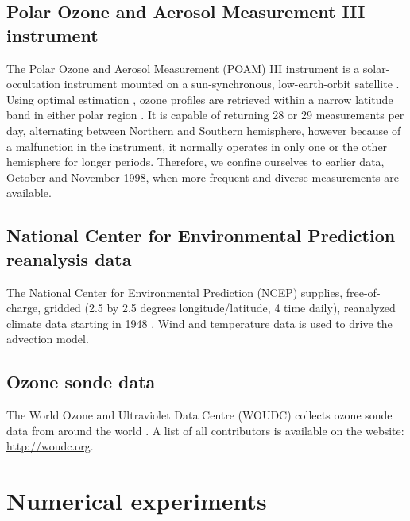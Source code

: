 \documentclass{article}
\begin{document}
\subsection{Polar Ozone and Aerosol Measurement III instrument}

The Polar Ozone and Aerosol Measurement (POAM) III instrument is a solar-
occultation instrument mounted on a sun-synchronous, low-earth-orbit
satellite \citep{Lucke_etal1999}.  
Using optimal estimation \citep{Rodgers2000}, ozone profiles are retrieved 
within a narrow latitude band in either polar region \citep{Lumpe_etal2002}.  
It is capable of returning 28 or 29 measurements per day,
alternating between Northern and Southern hemisphere, however because of
a malfunction
in the instrument, it normally operates in only one or the other hemisphere for longer periods.  Therefore, we confine ourselves to earlier data,
October and November 1998, when more frequent and diverse measurements
are available.

\subsection{National Center for Environmental Prediction reanalysis data}

The National Center for Environmental Prediction (NCEP) supplies, 
free-of-charge,
gridded (2.5 by 2.5 degrees longitude/latitude, 4 time daily), reanalyzed 
climate data starting in 1948 \citep{Kalnay_etal1996}.
Wind and temperature data is used to drive the advection model.

\subsection{Ozone sonde data}

The World Ozone and Ultraviolet Data Centre (WOUDC) collects ozone sonde data
from around the world \citep{Hare_etal2000}. A list of all contributors is available on the website:
\url{http://woudc.org}.


\section{Numerical experiments}
\end{document}
